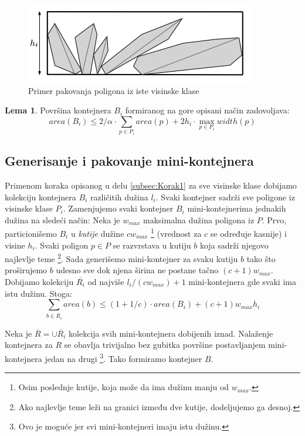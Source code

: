 \documentclass[a4paper]{article}
\theoremstyle{plain}
\theoremstyle{definition}
\newtheorem{lem}[thm]{Lema}
\begin{document}
\begin{figure}[H]
    \centering
    \includegraphics[scale=0.6]{resources/fig1.PNG}
    \caption{Primer pakovanja poligona iz iste visinske klase}
    \label{fig1}
\end{figure}

\begin{lem}
    Povr\v{s}ina kontejnera $B_{i}$ formiranog na gore opisani na\v{c}in zadovoljava: $$area(B_{i}) \leq 2/\alpha \cdot \sum_{p \in P_{i}}{area(p) + 2h_{i} \cdot \max_{p \in P_{i}}{width(p)}}$$
\end{lem}


\subsection{Generisanje i pakovanje mini-kontejnera}
\label{subsec:Korak2}

Primenom koraka opisanog u delu \ref{subsec:Korak1} za sve visinske klase dobijamo kolekciju kontejnera $B_{i}$ razli\v{c}itih du\v{z}ina $l_{i}$. Svaki kontejner sadr\v{z}i sve poligone iz visinske klase $P_{i}$. Zamenjujemo svaki kontejner $B_{i}$ mini-kontejnerima jednakih du\v{z}ina na slede\'c{}i na\v{c}in: Neka je $w_{max}$ maksimalna du\v{z}ina poligona iz $P$. Prvo, particioni\v{s}emo $B_{i}$ u \emph{kutije} du\v{z}ine $cw_{max}$ \footnote{Osim poslednje kutije, koja mo\v{z}e da ima du\v{z}inu manju od $w_{max}$.} (vrednost za $c$ se određuje kasnije) i visine $h_{i}$. Svaki poligon $p \in P$ se razvrstava u kutiju $b$ koja sadr\v{z}i njegovo najlevlje teme \footnote{Ako najlevlje teme le\v{z}i na granici između dve kutije, dodeljujemo ga desnoj.}. Sada generi\v{s}emo mini-kontejner za svaku kutiju $b$ tako \v{s}to pro\v{s}irujemo $b$ udesno sve dok njena \v{s}irina ne postane ta\v{c}no $(c+1)w_{max}$. Dobijamo kolekciju $\overline{R_{i}}$ od najvi\v{s}e $l_{i}/(cw_{max}) + 1$ mini-kontejnera gde svaki ima istu du\v{z}inu. Stoga:
$$\sum_{b \in \overline{R_{i}}}{area(b)} \leq (1 + 1/c) \cdot area(B_{i}) + (c+1)w_{max}h_{i}$$

Neka je $\overline{R} = \cup{\overline{R_{i}}}$ kolekcija svih mini-kontejnera dobijenih iznad. Nala\v{z}enje kontejnera za $R$ se obavlja trivijalno bez gubitka povr\v{s}ine postavljanjem mini-kontejnera jedan na drugi \footnote{Ovo je mogu\'c{}e jer svi mini-kontejneri imaju istu du\v{z}inu.}. Tako formiramo kontejner $B$.
\end{document}

